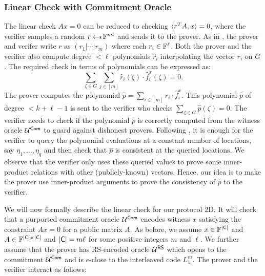 \subsubsection{Linear Check with Commitment Oracle}\label{subsec:lincheck2D}
The linear check $Ax=0$ can be reduced to checking $\langle r^TA,x\rangle=0$, where the verifier samples a random $r\hskip2.3pt{\gets\!\!\mbox{\tiny${\$}$\normalsize}}\, \mathbb{F}^{ml}$ and sends it to the prover. As in \cite{Ligero2017}, the prover and verifer write $r$ as $(r_{1}|\cdots|r_{m})$ where each $r_i\in \mathbb{F}^\ell$. Both the prover and the
verifier also compute degree $<\ell$ polynomials $\hat{r}_{i}$ interpolating the vector $r_{i}$ on $G$. The required check in terms of polynomials can be expressed as:
\begin{equation}\label{eq:lincheck2D}
\sum_{\zeta\in G}\sum_{j\in [m]}
\hat{r}_{i}(\zeta) \cdot \hat{f}^x_{i}(\zeta) = 0.
\end{equation}
The prover computes the polynomial $\hat{p}=\sum_{i\in[m]}\hat{r}_i \cdot \hat{f}^x_i$. This polynomial $\hat{p}$ of degree $< k+\ell-1$ is sent to the verifier who checks $\sum_{\zeta\in G}\hat{p}(\zeta)=0$. The verifier needs to check if the polynomial $\hat{p}$ is correctly computed from the witness oracle $\mathcal{U}^{\mathsf{Com}}$ to guard against dishonest provers. Following \cite{Ligero2017}, it is enough for the verifier to query the polynomial evaluations at a constant number of locations, say $\eta_1,\ldots,\eta_q$ and then check that $\hat{p}$ is consistent at the queried locations. We observe that the verifier only uses these queried values to prove some inner-product relations with other (publicly-known) vectors. Hence, our idea is to make the prover use inner-product arguments to prove the consistency of $\hat{p}$ to the verifier.

We will now formally describe the linear check for our protocol \name2D{}. It will check that a purported commitment oracle $\mathcal{U}^{\mathsf{Com}}$ encodes witness $x$ satisfying the constraint $Ax=0$ for a public matrix $A$. As before, we assume $x\in \mathbb{F}^{\mathsf{|C|}}$ and $A\in \mathbb{F}^{\mathsf{|C|}\times \mathsf{|C|}}$ and
$\mathsf{|C|} = m \ell$ for some positive integers $m$ and $\ell$. We further assume that the prover has RS-encoded oracle $\mathcal{U}^{\mathsf{RS}}$ which opens to the commitment $\mathcal{U}^{\mathsf{Com}}$ and is $e$-close to the interleaved code $L_1^{m}$. The prover and the verifier interact as follows: 

